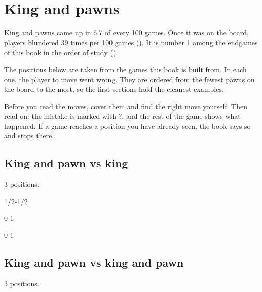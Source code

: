 \chapter{King and pawns}\label{ch:king-and-pawns}
King and pawns came up in 6.7 of every 100 games. Once it was on the board, players blundered 39 times per 100 games (). It is number 1 among the endgames of this book in the order of study ().

The positions below are taken from the games this book is built from. In each one, the player to move went wrong. They are ordered from the fewest pawns on the board to the most, so the first sections hold the cleanest examples.

Before you read the moves, cover them and find the right move yourself. Then read on: the mistake is marked with ?, and the rest of the game shows what happened. If a game reaches a position you have already seen, the book says so and stops there.


\section{King and pawn vs king}
3 positions.


1/2-1/2\par
{}

0-1\par
{}

0-1\par
\section{King and pawn vs king and pawn}
3 positions.

